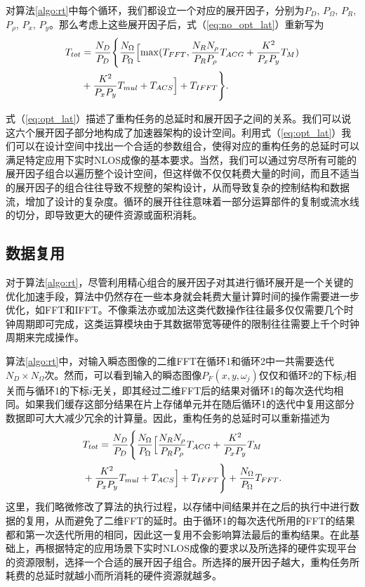\documentclass[master]{shtthesis}             %
\begin{document}
对算法\ref{algo:rt}中每个循环，我们都设立一个对应的展开因子，分别为$P_D$, $P_\Omega$, $P_R$, $P_\rho$, $P_x$, $P_y$。那么考虑上这些展开因子后，式（\ref{eq:no_opt_lat}）重新写为
\begin{equation}
    \begin{split}
        T_{tot} &= \frac{N_D}{P_D} \Biggl\{ \frac{N_{\Omega}}{P_{\Omega}} \Bigl[ \max (T_{FFT}, \frac{N_{ {R}}N_{\rho}}{P_{ {R}}P_{\rho}} T_{ACG}+\frac{K^2}{P_xP_y}T_M)\\ &+ \frac{K^2}{P_xP_y}T_{mul}+T_{ACS} \Bigr] + T_{IFFT}\Biggr\} \label{eq:opt_lat}.
    \end{split}
\end{equation}

式（\ref{eq:opt_lat}）描述了重构任务的总延时和展开因子之间的关系。我们可以说这六个展开因子部分地构成了加速器架构的设计空间。利用式（\ref{eq:opt_lat}）我们可以在设计空间中找出一个合适的参数组合，使得对应的重构任务的总延时可以满足特定应用下实时NLOS成像的基本要求。当然，我们可以通过穷尽所有可能的展开因子组合以遍历整个设计空间，但这样做不仅仅耗费大量的时间，而且不适当的展开因子的组合往往导致不规整的架构设计，从而导致复杂的控制结构和数据流，增加了设计的复杂度。循环的展开往往意味着一部分运算部件的复制或流水线的切分，即导致更大的硬件资源或面积消耗。%

\subsection{数据复用}

对于算法\ref{algo:rt}，尽管利用精心组合的展开因子对其进行循环展开是一个关键的优化加速手段，算法中仍然存在一些本身就会耗费大量计算时间的操作需要进一步优化，如FFT和IFFT。不像乘法亦或加法这类代数操作往往最多仅仅需要几个时钟周期即可完成，这类运算模块由于其数据带宽等硬件的限制往往需要上千个时钟周期来完成操作。

算法\ref{algo:rt}中，对输入瞬态图像的二维FFT在循环1和循环2中一共需要迭代$N_D\times N_\Omega$次。然而，可以看到输入的瞬态图像$P_F(x,y,\omega_j)$仅仅和循环2的下标$j$相关而与循环1的下标$i$无关，即其经过二维FFT后的结果对循环1的每次迭代均相同。如果我们缓存这部分结果在片上存储单元并在随后循环1的迭代中复用这部分数据即可大大减少冗余的计算量。因此，重构任务的总延时可以重新描述为
\begin{equation}
    \begin{split}
        &T_{tot} = \frac{N_D}{P_D} \Biggl\{ \frac{N_{\Omega}}{P_{\Omega}} \Bigl[ \frac{N_{ {R}}N_{\rho}}{P_{ {R}}P_{\rho}} T_{ACG}+\frac{K^2}{P_xP_y}T_M \\ &+ \frac{K^2}{P_xP_y}T_{mul}+T_{ACS} \Bigr] + T_{IFFT}\Biggr\} + \frac{N_{\Omega}}{P_{\Omega}} T_{FFT}. \label{eq:tt}
    \end{split}
\end{equation}
这里，我们略微修改了算法的执行过程，以存储中间结果并在之后的执行中进行数据的复用，从而避免了二维FFT的延时。由于循环1的每次迭代所用的FFT的结果都和第一次迭代所用的相同，因此这一复用不会影响算法最后的重构结果。在此基础上，再根据特定的应用场景下实时NLOS成像的要求以及所选择的硬件实现平台的资源限制，选择一个合适的展开因子组合。所选择的展开因子越大，重构任务所耗费的总延时就越小而所消耗的硬件资源就越多。
\end{document}

